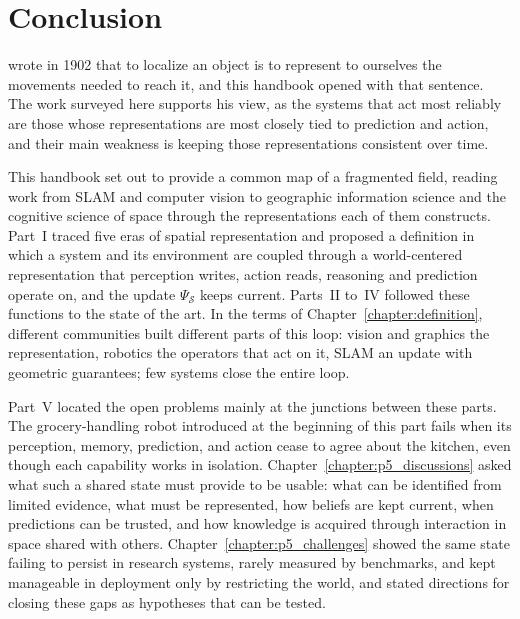 \chapter{Conclusion}
\label{chapter:p5_conclusion}



 wrote in 1902 that to localize an object is to represent to ourselves the movements needed to reach it, and this handbook opened with that sentence.
The work surveyed here supports his view, as the systems that act most reliably are those whose representations are most closely tied to prediction and action, and their main weakness is keeping those representations consistent over time.

This handbook set out to provide a common map of a fragmented field, reading work from SLAM and computer vision to geographic information science and the cognitive science of space through the representations each of them constructs.
Part~I traced five eras of spatial representation and proposed a definition in which a system and its environment are coupled through a world-centered representation that perception writes, action reads, reasoning and prediction operate on, and the update $\Psi_{\mathcal{S}}$ keeps current.
Parts~II to~IV followed these functions to the state of the art.
In the terms of Chapter~\ref{chapter:definition}, different communities built different parts of this loop: vision and graphics the representation, robotics the operators that act on it, SLAM an update with geometric guarantees; few systems close the entire loop.

Part~V located the open problems mainly at the junctions between these parts.
The grocery-handling robot introduced at the beginning of this part fails when its perception, memory, prediction, and action cease to agree about the kitchen, even though each capability works in isolation.
Chapter~\ref{chapter:p5_discussions} asked what such a shared state must provide to be usable: what can be identified from limited evidence, what must be represented, how beliefs are kept current, when predictions can be trusted, and how knowledge is acquired through interaction in space shared with others.
Chapter~\ref{chapter:p5_challenges} showed the same state failing to persist in research systems, rarely measured by benchmarks, and kept manageable in deployment only by restricting the world, and stated directions for closing these gaps as hypotheses that can be tested.

